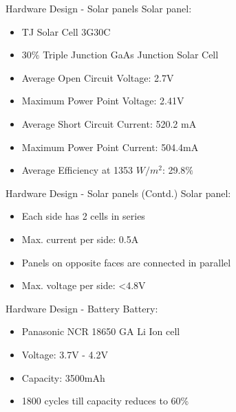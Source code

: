 \documentclass[aspectratio=169]{beamer}
\begin{document}
	\begin{frame}{Hardware Design - Solar panels}
		Solar panel:
			\begin{itemize}
			\item TJ Solar Cell 3G30C
			\item 30$\%$ Triple Junction GaAs Junction Solar Cell
		
			\item Average Open Circuit Voltage: 2.7V
			\item Maximum Power Point Voltage: 2.41V
			\item Average Short Circuit Current: 520.2 mA
			\item Maximum Power Point Current: 504.4mA
			\item Average Efficiency at 1353 $W/m^{2}$: 29.8$\%$

		\end{itemize}
	\end{frame}
	
	
		\begin{frame}{Hardware Design - Solar panels (Contd.)}
		Solar panel:
		\begin{itemize}
			\item Each side has 2 cells in series
			\item Max. current per side: 0.5A
			\item Panels on opposite faces are connected in parallel
			\item Max. voltage per side: <4.8V
		\end{itemize}
	\end{frame}
	
	
		\begin{frame}{Hardware Design - Battery}
		Battery:
		\begin{itemize}
			\item Panasonic NCR 18650 GA Li Ion cell
			\item Voltage: 3.7V - 4.2V
			\item Capacity: 3500mAh
			\item 1800 cycles till capacity reduces to 60\%

		\end{itemize}
	\end{frame}
	
%	
%		
%	
	
\end{document}
